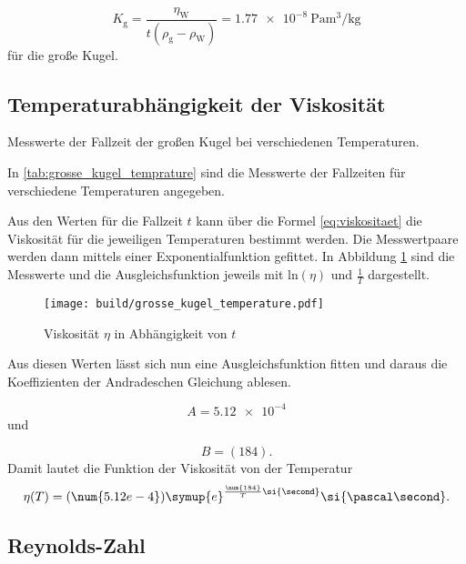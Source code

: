 \begin{equation}
  K_\text{g} = \frac{\eta_\text{W}}{t(\rho_\text{g}-\rho_\text{W})}
  = \SI{1.77e-8}{\pascal\cubic\meter\per\kilo\gram}
\end{equation}
für die große Kugel.


\subsection{Temperaturabhängigkeit der Viskosität}

\begin{table}
  \centering
  
  \caption{Messwerte der Fallzeit der großen Kugel bei verschiedenen Temperaturen.}
  \label{tab:grosse_kugel_temprature}
\end{table}

\noindent In \autoref{tab:grosse_kugel_temprature} sind die Messwerte der Fallzeiten für verschiedene Temperaturen angegeben.


\noindent Aus den Werten für die Fallzeit $t$ kann über die Formel \eqref{eq:viskositaet}
die Viskosität für die jeweiligen Temperaturen bestimmt werden.
Die Messwertpaare werden dann mittels einer Exponentialfunktion gefittet.
In Abbildung \ref{fig:grosse_kugel_temperatur} sind die Messwerte und die Ausgleichsfunktion
jeweils mit ln$(\eta)$ und $\frac{1}{T}$ dargestellt.

\begin{figure}[H]
  \centering
  \texttt{[image: build/grosse\_kugel\_temperature.pdf]}
  \caption{Viskosität $\eta$ in Abhängigkeit von $t$}
  \label{fig:grosse_kugel_temperatur}
\end{figure}

\noindent Aus diesen Werten lässt sich nun eine Ausgleichsfunktion fitten und daraus die Koeffizienten der Andradeschen Gleichung ablesen.


\begin{equation}
  A = \num{5.12e-4}
\end{equation}
und

\begin{equation}
  B = (\num{184}).
\end{equation}
Damit lautet die Funktion der Viskosität von der Temperatur
\begin{equation}
  \eta(T) = (\num{5.12e-4}) \symup{e}^{\frac{\num{184}}{T}\si{\second}}
  \si{\pascal\second}.
\end{equation}


\subsection{Reynolds-Zahl}

